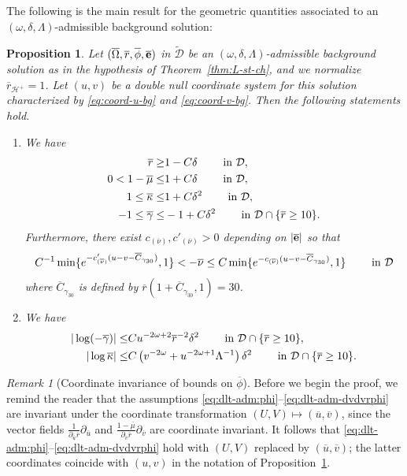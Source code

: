 \documentclass[10pt, reqno]{amsart}
\newtheorem{proposition}[theorem]{Proposition}
\theoremstyle{definition}
\theoremstyle{remark}
\newtheorem{remark}[theorem]{Remark}
\theoremstyle{conjecture}
\numberwithin{equation}{section}
\newcommand{\abs}[1]{\vert#1\vert}
\newcommand{\set}[1]{\{#1\}}
\newcommand{\rd}{\partial}
\newcommand{\0}{\emptyset}
\newcommand{\gmm}{\gamma}
\newcommand{\dlt}{\delta}
\newcommand{\kpp}{\kappa}
\newcommand{\lmb}{\lambda}
\newcommand{\Lmb}{\Lambda}
\newcommand{\omg}{\omega}
\newcommand{\Omg}{\Omega}
\newcommand{\bfe}{{\bf e}}
\newcommand{\calD}{\mathcal D}
\newcommand{\calH}{\mathcal H}
\newcommand{\calI}{\mathcal I}
\newcommand{\dur}{\nu}
\newcommand{\dvr}{\lmb}
\newcommand{\EH}{\calH^{+}}
\newcommand{\e}{\bfe}							%
\newcommand{\NI}{\calI^{+}}						%
\newcommand{\ubg}{\overline{u}}					%
\newcommand{\vbg}{\overline{v}}					%
\newcommand{\Omgbg}{\overline{\Omg}}				%
\newcommand{\phibg}{\overline{\phi}}				%
\newcommand{\durbg}{\overline{\dur}}				%
\newcommand{\rbg}{\overline{r}}					%
\newcommand{\mubg}{\overline{\mu}}				%
\newcommand{\kppbg}{\overline{\kpp}}					%
\newcommand{\gmmbg}{\overline{\gmm}}					%
\newcommand{\ebg}{\overline{\e}}					%
\begin{document}
The following is the main result for the geometric quantities associated to an $(\omg, \dlt, \Lmb)$-admissible background solution:
\begin{proposition} \label{prop:bg-geom}
Let $(\Omgbg, \rbg, \phibg, \ebg)$ in $\widetilde{\calD}$ be an $(\omg, \dlt, \Lmb)$-admissible background solution as in the hypothesis of Theorem~\ref{thm:L-st-ch}, and we normalize $\rbg_{\EH} = 1$.
Let $(u, v)$ be a double null coordinate system for this solution characterized by \eqref{eq:coord-u-bg} and \eqref{eq:coord-v-bg}. 
Then the following statements hold.
\begin{enumerate}
\item We have
\begin{align}
	\rbg \geq & 1 - C \dlt \qquad \hbox{ in } \calD, \label{eq:rbg-bnd}   \\
	0 < 1-\mubg \leq & 1 + C \dlt \qquad \hbox{ in } \calD, \label{eq:mubg-bnd} \\
	1 \leq \kppbg \leq & 1 + C \dlt^{2} \qquad  \hbox{ in } \calD, \label{eq:kppbg-bnd} \\
	- 1 \leq \gmmbg \leq & - 1 + C \dlt^{2} \qquad  \hbox{ in } \calD \cap \set{\rbg \geq 10}. \label{eq:gmmbg-bnd}  
\end{align}
Furthermore, there exist $c_{(\durbg)}, c'_{(\durbg)} > 0$ depending on $|\ebg|$ so that
\begin{equation} \label{eq:durbg-bnd} 
	C^{-1} \min \set{e^{- c'_{(\durbg)}(u - v - \overline{C}_{\gmm_{30}})}, 1} < - \durbg \leq C \min \set{e^{- c_{(\durbg)} (u - v - \overline{C}_{\gmm_{30}})}, 1} \qquad  \hbox{ in } \calD
\end{equation}
where $\overline{C}_{\gmm_{30}}$ is defined by $\rbg(1 + \overline{C}_{\gmm_{30}}, 1) = 30$.
\item We have
\begin{align} 
	\abs{\log(-\gmmbg)} \leq & C u^{-2 \omg + 2} \rbg^{-2} \dlt^{2} \qquad \hbox{ in } \calD \cap \set{\rbg \geq 10} ,\label{eq:gmmbg-decay} \\
	\abs{\log \kppbg} \leq & C \left( v^{-2 \omg} + u^{-2 \omg + 1} \Lmb^{-1} \right) \dlt^{2} \qquad \hbox{ in } \calD \cap \set{\rbg \geq 10} .\label{eq:kppbg-decay} 
\end{align}
\end{enumerate}
\end{proposition}
\begin{remark} [Coordinate invariance of bounds on $\phibg$]
Before we begin the proof, we remind the reader that the assumptions \eqref{eq:dlt-adm:phi}--\eqref{eq:dlt-adm-dvdvrphi} are invariant under the coordinate transformation $(U, V) \mapsto (\ubg, \vbg)$, since the vector fields $\frac{1}{\rd_{\ubg} \rbg} \rd_{\ubg}$ and $\frac{1-\mubg}{\rd_{\vbg} \rbg} \rd_{\vbg}$ are coordinate invariant. It follows that \eqref{eq:dlt-adm:phi}--\eqref{eq:dlt-adm-dvdvrphi} hold with $(U, V)$ replaced by $(\ubg, \vbg)$; the latter coordinates coincide with $(u, v)$ in the notation of Proposition~\ref{prop:bg-geom}.
\end{remark}
\end{document}
